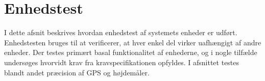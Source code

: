 \chapter{Enhedstest}
I dette afsnit beskrives hvordan enhedstest af systemets enheder er udført. Enhedstesten bruges til at verificerer, at hver enkel del virker uafhængigt af andre enheder. 
Der testes primært basal funktionalitet af enhederne, og i nogle tilfælde undersøges hvorvidt krav fra kravspecifikationen opfyldes. I afsnittet testes blandt andet præcision af GPS og højdemåler.





\newpage


\newpage


\newpage 


%

\newpage

